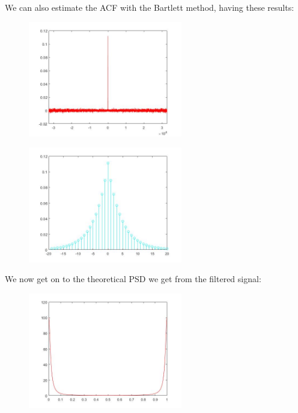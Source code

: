 \documentclass[a4paper,11pt]{article}
\begin{document}
\newpage

We can also estimate the ACF with the Bartlett method, having these results:

\begin{figure}[!hp]
    \begin{center}
    \includegraphics[width=0.6\textwidth]{images/lab2_figure3.jpg}
    \end{center}
\end{figure}

\begin{figure}[!hp]
    \begin{center}
    \includegraphics[width=0.6\textwidth]{images/lab2_figure2.jpg}
    \end{center}
\end{figure}

\newpage

We now get on to the theoretical PSD we get from the filtered signal:

\begin{figure}[!hp]
    \begin{center}
    \includegraphics[width=0.6\textwidth]{images/lab1_figure1_3.jpg}
    \end{center}
\end{figure}
\end{document}
